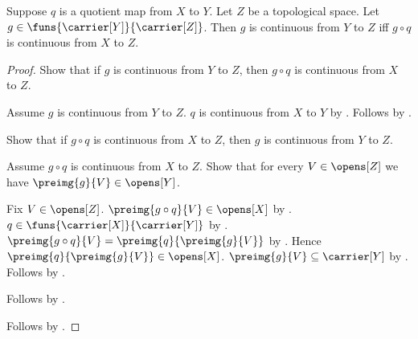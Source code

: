 \begin{theorem}\label{quotient_map_continuity_criterion}
    Suppose $q$ is a quotient map from $X$ to $Y$.
    Let $Z$ be a topological space.
    Let $g\in\funs{\carrier[Y]}{\carrier[Z]}$.
    Then $g$ is continuous from $Y$ to $Z$ iff
        $g\circ q$ is continuous from $X$ to $Z$.
\end{theorem}
\begin{proof}
    Show that if $g$ is continuous from $Y$ to $Z$, then
        $g\circ q$ is continuous from $X$ to $Z$.
    \begin{subproof}
        Assume $g$ is continuous from $Y$ to $Z$.
        $q$ is continuous from $X$ to $Y$ by
            .
        Follows by .
    \end{subproof}

    Show that if $g\circ q$ is continuous from $X$ to $Z$, then
        $g$ is continuous from $Y$ to $Z$.
    \begin{subproof}
        Assume $g\circ q$ is continuous from $X$ to $Z$.
        Show that for every $V\in\opens[Z]$ we have
            $\preimg{g}{V}\in\opens[Y]$.
        \begin{subproof}
            Fix $V\in\opens[Z]$.
            $\preimg{g\circ q}{V}\in\opens[X]$ by
                .
            $q\in\funs{\carrier[X]}{\carrier[Y]}$ by
                .
            $\preimg{g\circ q}{V}
                =\preimg{q}{\preimg{g}{V}}$ by
                .
            Hence $\preimg{q}{\preimg{g}{V}}\in\opens[X]$.
            $\preimg{g}{V}\subseteq\carrier[Y]$ by
                .
            Follows by .
        \end{subproof}
        Follows by .
    \end{subproof}
    Follows by \auto.
\end{proof}
